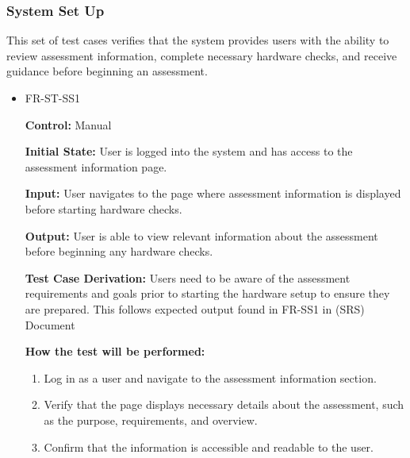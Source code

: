 \documentclass[12pt, titlepage]{article}
\begin{document}
\subsubsection{System Set Up}

\hspace{2em}This set of test cases verifies that the system provides users with the ability to 
review assessment information, complete necessary hardware checks, and receive guidance before beginning an assessment.

\begin{itemize}
  \item FR-ST-SS1
    \begin{mdframed}[linewidth=0.5mm]
      \textbf{Control:} Manual \par
      \textbf{Initial State:} User is logged into the system and has access to the assessment information page. \par
      \textbf{Input:} User navigates to the page where assessment information is displayed before starting hardware checks. \par
      \textbf{Output:} User is able to view relevant information about the assessment before beginning any hardware checks. \par
      \textbf{Test Case Derivation:} Users need to be aware of the assessment requirements and goals prior to starting 
      the hardware setup to ensure they are prepared. This follows expected output found in FR-SS1 in (SRS) Document \par
      \textbf{How the test will be performed:}
      \begin{enumerate}[noitemsep]
        \item Log in as a user and navigate to the assessment information section.
        \item Verify that the page displays necessary details about the assessment, such as the purpose, requirements, and overview.
        \item Confirm that the information is accessible and readable to the user.
      \end{enumerate}
    \end{mdframed}


\end{itemize}
\end{document}
